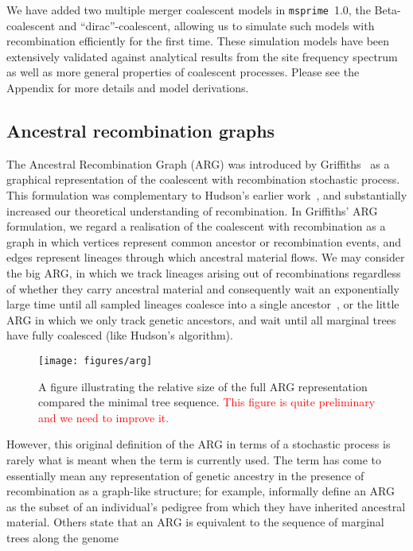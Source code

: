 \documentclass{article}
\newcommand{\msprime}[0]{\texttt{msprime}}
\newcommand{\jkcomment}[1]{\textcolor{red}{#1}}
\begin{document}
We have added two multiple merger coalescent models in \msprime\ 1.0, the
Beta-coalescent and ``dirac''-coalescent, allowing us to simulate
such models with recombination efficiently for the first time.
These simulation models have been extensively validated against
analytical results from the site frequency
spectrum~\citep{birkner2013statistical,blath2016site,hobolth2019phase}
 as well as more general properties of coalescent processes.
Please see the Appendix for more details and model derivations.


\subsection*{Ancestral recombination graphs}

The Ancestral Recombination Graph (ARG) was introduced by
Griffiths~\citep{griffiths1991two,griffiths1997ancestral} as a graphical
representation of the coalescent with recombination stochastic process. This
formulation was complementary to Hudson's earlier
work~\citep{hudson1983properties}, and substantially increased our theoretical
understanding of recombination. In Griffiths' ARG formulation, we
regard a realisation of the coalescent with recombination as a graph in which
vertices represent common ancestor or recombination events, and edges represent
lineages through which ancestral material flows.
We may consider the big ARG, in which we track lineages arising out of
recombinations regardless of whether they carry ancestral material and
consequently wait an exponentially large time until all sampled lineages
coalesce into a single ancestor~\citep{ethier1990two}, or the little ARG in
which we only track genetic ancestors, and wait until all marginal trees
have fully coalesced (like Hudson's algorithm).

\begin{figure}
\begin{center}
\texttt{[image: figures/arg]}
\end{center}
\caption{\label{fig-arg} A figure illustrating the relative size of
the full ARG representation compared the minimal tree sequence.
\jkcomment{This figure is quite preliminary and we need to improve it.}}
\end{figure}

However, this original definition of the ARG in terms of a stochastic process
is rarely what is meant when the term is currently used. The term has come to
essentially mean any representation of genetic ancestry in the presence
of recombination as a graph-like structure; for example,
\cite{mathieson2020ancestry} informally define an ARG as the subset of an
individual's pedigree from which they have inherited ancestral material.
Others state that an ARG is equivalent to the sequence of marginal
trees along the genome~\citep{mirzaei2016rent}
\end{document}
